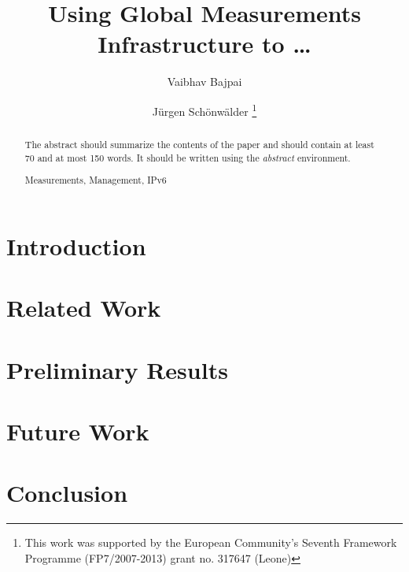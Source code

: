 \documentclass[a4paper]{llncs}
\newcommand{\keywords}[1]{\par\addvspace\baselineskip
\noindent\keywordname\enspace\ignorespaces#1}
\begin{document}
\mainmatter  %

\title{Using Global Measurements Infrastructure to \ldots}

\author{Vaibhav Bajpai \and Jürgen Schönwälder%
\thanks{This work was supported by the European Community’s Seventh Framework
Programme (FP7/2007-2013) grant no. 317647 (Leone)}}
\maketitle

\begin{abstract}
The abstract should summarize the contents of the paper and should
contain at least 70 and at most 150 words. It should be written using the
\emph{abstract} environment.
\keywords{Measurements, Management, IPv6}
\end{abstract}


\section{Introduction}
\label{sec:introduction}
\section{Related Work}
\label{sec:relatedwork}
\section{Preliminary Results}
\label{sec:preliminaryresults}
\section{Future Work}\label{sec:futurework}

\section{Conclusion}
\label{sec:conclusion}





\end{document}

